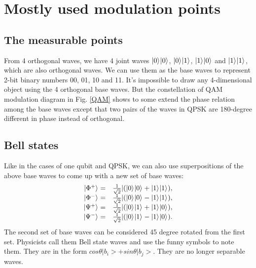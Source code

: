 \documentclass[Letter,11pt]{book}
\begin{document}
\section{Mostly used modulation points}
\subsection{The measurable points}
From 4 orthogonal waves, we have 4 joint waves $\vert {0} \rangle_{}\vert {0} \rangle_{}$, $\vert {0} \rangle_{}\vert {1} \rangle_{}$, $\vert {1} \rangle_{}\vert {0} \rangle_{}$ and $\vert {1} \rangle_{}\vert {1} \rangle_{}$, which are also orthogonal waves. We can use them as the base waves to represent 2-bit binary numbers 00, 01, 10 and 11. It's impossible to draw any 4-dimensional object using the 4 orthogonal base waves. But the constellation of QAM modulation diagram in Fig. \ref{QAM} shows to some extend the phase relation among the base waves except that two pairs of the waves in QPSK are 180-degree different in phase instead of orthogonal.


\subsection{Bell states}
Like in the cases of one qubit and QPSK, we can also use superpositions of the above base waves to come up with a new set of base waves:
\begin{equation}
\begin{array}{rl}
    \vert {\Phi^{+}} \rangle_{} =& \frac 1 {\sqrt 2}| (\vert {0} \rangle_{}\vert {0} \rangle_{}+\vert {1} \rangle_{}\vert {1} \rangle_{}),\\
    \vert {\Phi^{-}} \rangle_{} =& \frac 1 {\sqrt 2}| (\vert {0} \rangle_{}\vert {0} \rangle_{}-\vert {1} \rangle_{}\vert {1} \rangle_{}),\\
    \vert {\Psi^{+}} \rangle_{} =& \frac 1 {\sqrt 2}| (\vert {0} \rangle_{}\vert {1} \rangle_{}+\vert {1} \rangle_{}\vert {0} \rangle_{}),\\
    \vert {\Psi^{-}} \rangle_{} =& \frac 1 {\sqrt 2}| (\vert {0} \rangle_{}\vert {1} \rangle_{}-\vert {1} \rangle_{}\vert {0} \rangle_{}).
\end{array}
\end{equation}
The second set of base waves can be considered 45 degree rotated from the first set. Physicists call them Bell state waves and use the funny symbols to note them. They are in the form $cos\theta |b_i> + sin\theta |b_j>$. They are no longer separable waves.
\end{document}
